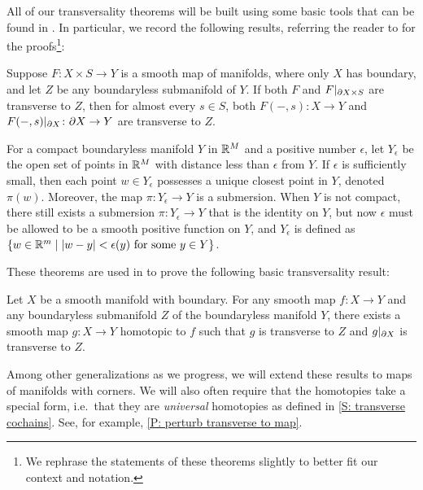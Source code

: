 All of our transversality theorems will be built using some basic tools that can be found in \cite[Section 2.3]{GuPo74}.
In particular, we record the following results, referring the reader to \cite[Section 2.3]{GuPo74} for the proofs\footnote{We rephrase the statements of these theorems slightly to better fit our context and notation.}:

\begin{theorem}\label{T: GP transversality}
	Suppose $F \colon X \times S \to Y$ is a smooth map of manifolds, where only $X$ has boundary, and let $Z$ be any boundaryless submanifold of $Y$.
	If both $F$ and $F|_{\partial X \times S}$ are transverse to $Z$, then for almost every $s \in S$, both $F(-,s) \colon X \to Y$ and $F(-,s)|_{\partial X} \colon \partial X \to Y$ are transverse to $Z$.
\end{theorem}

\begin{theorem}\label{T: epsilon neighborhood}
	For a compact boundaryless manifold $Y$ in $\mathbb{R}^M$ and a positive number $\epsilon$, let $Y_\epsilon$ be the open set of points in $\mathbb{R}^M$ with distance less than $\epsilon$ from $Y$.
	If $\epsilon$ is sufficiently small, then each point $w \in Y_\epsilon$ possesses a unique closest point in $Y$, denoted $\pi(w)$.
	Moreover, the map $\pi \colon Y_\epsilon \to Y$ is a submersion.
	When $Y$ is not compact, there still exists a submersion $\pi \colon Y_\epsilon \to Y$ that is the identity on $Y$, but now $\epsilon$ must be allowed to be a smooth positive function on $Y$, and $Y_\epsilon$ is defined as $\{w \in \mathbb{R}^m \mid |w-y|<\epsilon(y) \text{\ for some\ } y \in Y\}$.
\end{theorem}

These theorems are used in \cite{GuPo74} to prove the following basic transversality result:

\begin{theorem}
	Let $X$ be a smooth manifold with boundary.
	For any smooth map $f \colon X \to Y$ and any boundaryless submanifold $Z$ of the boundaryless manifold $Y$, there exists a smooth map $g \colon X \to Y$ homotopic to $f$ such that $g$ is transverse to $Z$ and $g|_{\partial X}$ is transverse to $Z$.
\end{theorem}

Among other generalizations as we progress, we will extend these results to maps of manifolds with corners.
We will also often require that the homotopies take a special form, i.e.\ that they are \textit{universal} homotopies as defined in \cref{S: transverse cochains}.
See, for example, \cref{P: perturb transverse to map}.

